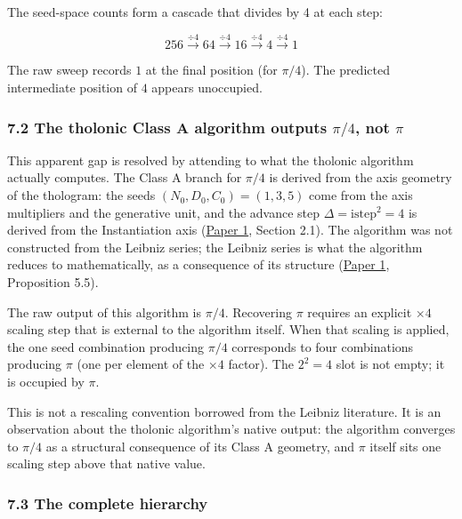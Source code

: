 \documentclass[
  11pt,
  letterpaper,
]{article}
\begin{document}
The seed-space counts form a cascade that divides by 4 at each step:

\[
256 \xrightarrow{\div 4} 64 \xrightarrow{\div 4} 16 \xrightarrow{\div 4} 4 \xrightarrow{\div 4} 1
\]

The raw sweep records \(1\) at the final position (for \(\pi/4\)). The
predicted intermediate position of \(4\) appears unoccupied.

\subsubsection{\texorpdfstring{7.2 The tholonic Class A algorithm
outputs \(\pi/4\), not
\(\pi\)}{7.2 The tholonic Class A algorithm outputs \textbackslash pi/4, not \textbackslash pi}}\label{the-tholonic-class-a-algorithm-outputs-pi4-not-pi}

This apparent gap is resolved by attending to what the tholonic
algorithm actually computes. The Class A branch for \(\pi/4\) is derived
from the axis geometry of the thologram: the seeds
\((N_0, D_0, C_0) = (1, 3, 5)\) come from the axis multipliers and the
generative unit, and the advance step \(\Delta = \mathrm{istep}^2 = 4\)
is derived from the Instantiation axis
(\href{https://github.com/baardev/truevalue/blob/main/docnav/Research/papers/1_recursive-tholonic-five-constants/1_recursive-tholonic-five-constants.pdf}{Paper
1}, Section 2.1). The algorithm was not constructed from the Leibniz
series; the Leibniz series is what the algorithm reduces to
mathematically, as a consequence of its structure
(\href{https://github.com/baardev/truevalue/blob/main/docnav/Research/papers/1_recursive-tholonic-five-constants/1_recursive-tholonic-five-constants.pdf}{Paper
1}, Proposition 5.5).

The raw output of this algorithm is \(\pi/4\). Recovering \(\pi\)
requires an explicit \(\times 4\) scaling step that is external to the
algorithm itself. When that scaling is applied, the one seed combination
producing \(\pi/4\) corresponds to four combinations producing \(\pi\)
(one per element of the \(\times 4\) factor). The \(2^2 = 4\) slot is
not empty; it is occupied by \(\pi\).

This is not a rescaling convention borrowed from the Leibniz literature.
It is an observation about the tholonic algorithm's native output: the
algorithm converges to \(\pi/4\) as a structural consequence of its
Class A geometry, and \(\pi\) itself sits one scaling step above that
native value.

\subsubsection{7.3 The complete hierarchy}\label{the-complete-hierarchy}
\end{document}
